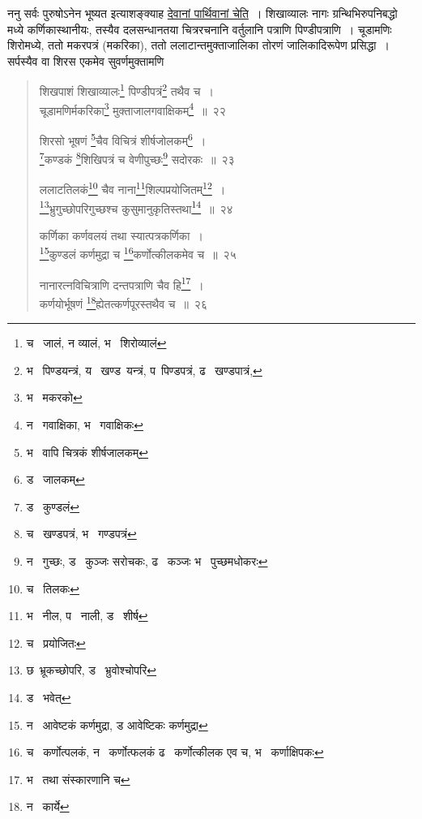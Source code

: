 \documentclass[11pt, openany]{book}
\begin{document}
ननु सर्वः पुरुषोऽनेन भूष्यत इत्याशङ्क्याह \underline{देवानां पार्थिवानां चेति}~। शिखाव्यालः नागः ग्रन्थिभिरुपनिबद्धो मध्ये कर्णिकास्थानीयः, तस्यैव दलसन्धानतया चित्ररचनानि वर्तुलानि पत्राणि पिण्डीपत्राणि~। चूडामणिः शिरोमध्ये, ततो मकरपत्रं (मकरिका), ततो ललाटान्तमुक्ताजालिका तोरणं जालिकादिरूपेण प्रसिद्धा~। सर्पस्यैव वा शिरस एकमेव सुवर्णमुक्तामणि\textendash

\newpage

\begin{quote}
{\na शिखपाशं शिखाव्यालः\renewcommand{\thefootnote}{1}\footnote{च \textendash\ जालं, न व्यालं, भ \textendash\ शिरोव्यालं} पिण्डीपत्रं\renewcommand{\thefootnote}{2}\footnote{भ \textendash\ पिण्डयन्त्रं, य \textendash\ खण्ड\textendash\ यन्त्रं, प\textendash\ पिण्डपत्रं, ढ \textendash\ खण्डपात्रं,} तथैव च~।\\
चूडामणिर्मकरिका\renewcommand{\thefootnote}{3}\footnote{भ \textendash\ मकरको} मुक्ताजालगवाक्षिकम्\renewcommand{\thefootnote}{4}\footnote{न \textendash\ गवाक्षिका, भ \textendash\ गवाक्षिकः}~॥~२२

शिरसो भूषणं \renewcommand{\thefootnote}{5}\footnote{भ \textendash\ वापि चित्रकं शीर्षजालकम्}चैव विचित्रं शीर्षजोलकम्\renewcommand{\thefootnote}{6}\footnote{ड \textendash\ जालकम्}~।\\
\renewcommand{\thefootnote}{7}\footnote{ड \textendash\ कुण्डलं}कण्डकं \renewcommand{\thefootnote}{8}\footnote{च \textendash\ खण्डपत्रं, भ \textendash\ गण्डपत्रं}शिखिपत्रं च वेणीपुच्छः\renewcommand{\thefootnote}{9}\footnote{न \textendash\ गुच्छः, ड \textendash\ कुञ्जः सरोचकः, ढ \textendash\ कञ्जः भ \textendash\ पुच्छमधोकरः} सदोरकः~॥~२३

ललाटतिलकं\renewcommand{\thefootnote}{10}\footnote{च \textendash\ तिलकः} चैव नाना\renewcommand{\thefootnote}{11}\footnote{भ \textendash\ नील, प \textendash\ नाली, ड \textendash\ शीर्ष}शिल्पप्रयोजितम्\renewcommand{\thefootnote}{12}\footnote{च \textendash\ प्रयोजितः}~।\\
\renewcommand{\thefootnote}{13}\footnote{छ\textendash\ भ्रूकच्छोपरि, ड \textendash\ भ्रुवोश्चोपरि}भ्रुगुच्छोपरिगुच्छश्च कुसुमानुकृतिस्तथा\renewcommand{\thefootnote}{14}\footnote{ड \textendash\ भवेत्}~॥~२४

कर्णिका कर्णवलयं तथा स्यात्पत्रकर्णिका~।\\
\renewcommand{\thefootnote}{15}\footnote{न \textendash\ आवेष्टकं कर्णमुद्रा, ड आवेष्टिकः कर्णमुद्रा}कुण्डलं कर्णमुद्रा च \renewcommand{\thefootnote}{16}\footnote{च \textendash\ कर्णोत्पलकं, न \textendash\ कर्णोत्फलकं ढ \textendash\ कर्णोत्कीलक एव च, भ \textendash\ कर्णाक्षिपकः}कर्णोत्कीलकमेव च~॥~२५

नानारत्नविचित्राणि दन्तपत्राणि चैव हि\renewcommand{\thefootnote}{17}\footnote{भ \textendash\ तथा संस्कारणानि च}~।\\
कर्णयोर्भूषणं \renewcommand{\thefootnote}{18}\footnote{न \textendash\ कार्ये}ह्येतत्कर्णपूरस्तथैव च~॥~२६}
\end{quote}
\end{document}
